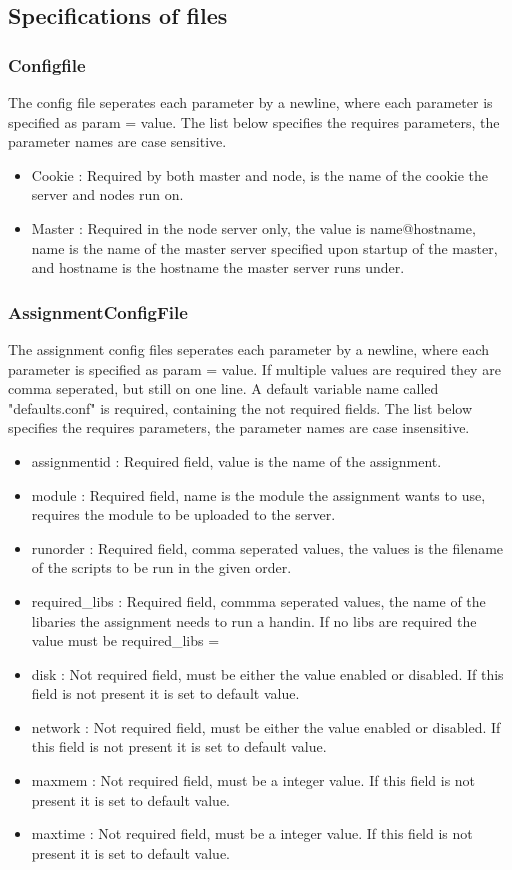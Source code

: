 \subsection{Specifications of files}
\subsubsection{Configfile}
\label{sec:config}
The config file seperates each parameter by a newline, where each parameter is specified as param = value.
The list below specifies the requires parameters, the parameter names are case sensitive.
\begin{itemize}
    \item Cookie : Required by both master and node, is the name of the cookie the server and nodes run on.
    \item Master : Required in the node server only, the value is name@hostname, name is the name of the master server specified upon startup of the master, and hostname is the hostname the master server runs under.
\end{itemize}
\subsubsection{AssignmentConfigFile}
\label{sec:assignment}
The assignment config files seperates each parameter by a newline, where each parameter is specified as param = value. If multiple values are required they are comma seperated, but still on one line. A default variable name called "defaults.conf" is required, containing the not required fields.
The list below specifies the requires parameters, the parameter names are case insensitive.
\begin{itemize}
    \item assignmentid : Required field, value is the name of the assignment.
    \item module : Required field, name is the module the assignment wants to use, requires the module to be uploaded to the server.
    \item runorder : Required field, comma seperated values, the values is the filename of the scripts to be run in the given order.
    \item required\_libs : Required field, commma seperated values, the name of the libaries the assignment needs to run a handin. If no libs are required the value must be required\_libs =
    \item disk : Not required field, must be either the value enabled or disabled. If this field is not present it is set to default value.
    \item network : Not required field, must be either the value enabled or disabled. If this field is not present it is set to default value.
    \item maxmem : Not required field, must be a integer value. If this field is not present it is set to default value.
    \item maxtime : Not required field, must be a integer value. If this field is not present it is set to default value.
\end{itemize}



